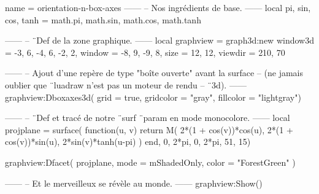 \documentclass{standalone}
\begin{document}
\begin{luadraw}{name = orientation-n-box-axes}
------
-- Nos ingrédients de base.
------
local pi, sin, cos, tanh = math.pi, math.sin, math.cos, math.tanh

------
-- ¨Def de la zone graphique.
------
local graphview = graph3d:new{
  window3d = {-3, 6, -4, 6, -2, 2},
  window   = {-8, 9, -9, 8},
  size     = {12, 12},
  viewdir  = {210, 70}
}

------
-- Ajout d'une repère de type "boîte ouverte" avant la surface
-- (ne jamais oublier que ¨luadraw n'est pas un moteur de rendu
-- ¨3d).
------
graphview:Dboxaxes3d({
  grid      = true,
  gridcolor = "gray",
  fillcolor = "lightgray"})

------
-- ¨Def et tracé de notre ¨surf ¨param en mode monocolore.
------
local projplane = surface(
  function(u, v)
    return M(
      2*(1 + cos(v))*cos(u),
      2*(1 + cos(v))*sin(u),
      2*sin(v)*tanh(u-pi)
    )
  end,
  0, 2*pi, 0, 2*pi,
  {51, 15})

graphview:Dfacet(
  projplane,
  {
    mode  = mShadedOnly,
    color = "ForestGreen"
  })

------
-- Et le merveilleux se révèle au monde.
------
graphview:Show()
\end{luadraw}
\end{document}
